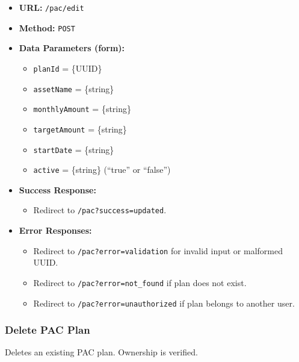 \begin{itemize}
    \item \textbf{URL:} \texttt{/pac/edit}
    \item \textbf{Method:} \texttt{POST}
    \item \textbf{Data Parameters (form):}
    \begin{itemize}
        \item \texttt{planId} = \{UUID\}
        \item \texttt{assetName} = \{string\}
        \item \texttt{monthlyAmount} = \{string\}
        \item \texttt{targetAmount} = \{string\}
        \item \texttt{startDate} = \{string\}
        \item \texttt{active} = \{string\} (``true'' or ``false'')
    \end{itemize}
    \item \textbf{Success Response:}
    \begin{itemize}
        \item Redirect to \texttt{/pac?success=updated}.
    \end{itemize}
    \item \textbf{Error Responses:}
    \begin{itemize}
        \item Redirect to \texttt{/pac?error=validation} for invalid input or malformed UUID.
        \item Redirect to \texttt{/pac?error=not\_found} if plan does not exist.
        \item Redirect to \texttt{/pac?error=unauthorized} if plan belongs to another user.
    \end{itemize}
\end{itemize}

\subsubsection{Delete PAC Plan}

Deletes an existing PAC plan. Ownership is verified.

